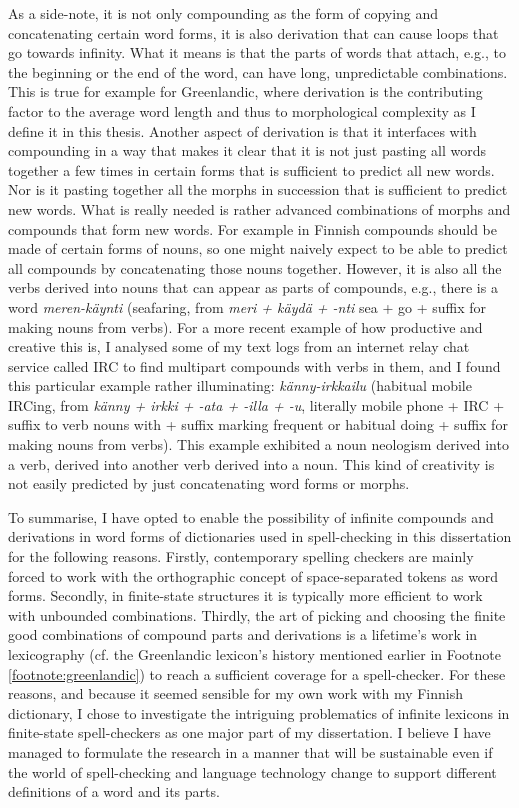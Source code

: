 \documentclass[officiallayout,final]{unihelcompling}
\begin{document}
As a side-note, it is not only compounding as the form of copying and
concatenating certain word forms, it is also derivation that can cause loops
that go towards infinity. What it means is that the parts of words that attach,
e.g., to the beginning or the end of the word, can have long, unpredictable
combinations. This is true for example for Greenlandic, where derivation is the
contributing factor to the average word length and thus to \gls{morphological
complexity} as I define it in this thesis.  Another aspect of derivation is
that it interfaces with compounding in a way that makes it clear that it is not
just pasting all words together a few times in certain forms that is sufficient
to predict all new words. Nor is it pasting together all the morphs in
succession that is sufficient to predict new words. What is really needed is
rather advanced combinations of morphs and compounds that form new words. For
example in Finnish compounds should be made of certain forms of nouns, so one
might naively expect to be able to predict all compounds by concatenating those
nouns together. However, it is also all the verbs derived into nouns that can
appear as parts of compounds, e.g., there is a word \emph{meren-käynti}
(seafaring, from \emph{meri + käydä + -nti} sea + go + suffix for making nouns
from verbs).  For a more recent example of how productive and creative this is,
I analysed some of my text logs from an internet relay chat service called IRC
to find multipart compounds with verbs in them, and I found this particular
example rather illuminating: \emph{känny-irkkailu} (habitual mobile IRCing,
from \emph{känny + irkki + -ata + -illa + -u}, literally mobile phone + IRC +
suffix to verb nouns with + suffix marking frequent or habitual doing + suffix
for making nouns from verbs). This example exhibited a noun neologism derived
into a verb, derived into another verb derived into a noun.  This kind of
creativity is not easily predicted by just concatenating word forms or morphs.

To summarise, I have opted to enable the possibility of infinite compounds and
derivations in word forms of dictionaries used in spell-checking in this
dissertation for the following reasons. Firstly, contemporary spelling checkers
are mainly forced to work with the orthographic concept of space-separated
tokens as word forms. Secondly, in finite-state structures it is typically more
efficient to work with unbounded combinations.  Thirdly, the art of picking and
choosing the finite good combinations of compound parts and derivations is
a lifetime's work in lexicography (cf. the Greenlandic lexicon's history
mentioned earlier in Footnote \ref{footnote:greenlandic}) to reach a sufficient
coverage for a spell-checker.  For these reasons, and because it seemed
sensible for my own work with my Finnish dictionary, I chose to investigate the
intriguing problematics of infinite lexicons in finite-state spell-checkers as
one major part of my dissertation. I believe I have managed to formulate the
research in a manner that will be sustainable even if the world of
spell-checking and language technology change to support different definitions
of a word and its parts.
\end{document}
